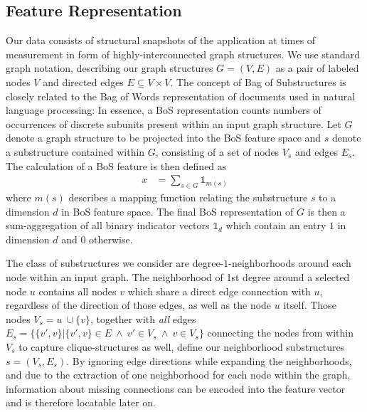 \documentclass{llncs}
\begin{document}
\subsection{Feature Representation}

Our data consists of structural snapshots of the application at times of measurement in form of highly-interconnected graph structures. We use standard graph notation, describing our graph structures $G=(V,E)$ as a pair of labeled nodes $V$ and directed edges $E \subseteq V\times V$.
The concept of Bag of Substructures is closely related to the Bag of Words representation of documents used in natural language processing: In essence, a BoS representation counts numbers of occurrences of discrete subunits present within an input graph structure. Let $G$ denote a graph structure to be projected into the BoS feature space and $s$ denote a substructure contained within $G$, consisting of a set of nodes $V_s$ and edges $E_s$. The calculation of a BoS feature is then defined as
\begin{align}
x & = \sum\limits_{s \in G} \mathds{1}_{m(s)} \label{eq:bosmap}
\end{align}
where $m(s)$ describes a mapping function relating the substructure $s$ to a dimension $d$ in BoS feature space. The final BoS representation of $G$ is then a sum-aggregation of all binary indicator vectors $\mathds{1}_d$ which contain an entry $1$ in dimension $d$ and $0$ otherwise. 

The class of substructures we consider are degree-$1$-neighborhoods around each node within an input graph. The neighborhood of 1st degree around a selected node $u$ contains all nodes $v$ which share a direct edge connection with $u$, regardless of the direction of those edges, as well as the node $u$ itself. Those nodes $V_s = u\ \cup \lbrace v \rbrace$, together with \emph{all} edges $E_s = \lbrace \lbrace v' , v \rbrace | \lbrace v' , v \rbrace \in E\ \land\ v' \in V_s\ \land\ v \in V_s \rbrace$ connecting the nodes from within $V_s$ to capture clique-structures as well, define our neighborhood substructures $s = (V_s, E_s)$. By ignoring edge directions while expanding the neighborhoods, and due to the extraction of one neighborhood for each node within the graph, information about missing connections can be encoded into the feature vector and is therefore locatable later on. 
\end{document}
